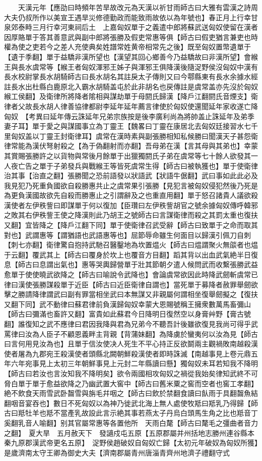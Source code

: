 　　天漢元年【應劭曰時頻年苦旱故改元為天漢以祈甘雨師古曰大雅有雲漢之詩周大夫仍叔所作以美宣王遇旱災修德勤政而能致雨故依以為年號也】春正月上行幸甘泉郊泰畤三月行幸河東祠后土　上嘉匈奴單于之義遣中郎將蘇武送匈奴使留在漢者因厚賂單于答其善意武與副中郎將張勝及假吏常惠等俱【師古曰假吏猶言兼吏也時權為使之吏若今之差人充使典矣姓譜常姓黄帝相常先之後】既至匈奴置幣遺單于【遺于季翻】單于益驕非漢所望也【漢望其回心鄉善今乃益驕故曰非漢所望】會緱王與長水虞常等【緱王者匈奴渾邪王姊子與渾邪王俱降漢後隨浞野侯沒匈奴中漢有長水校尉掌長水胡騎師古曰長水胡名其註戾太子傳則又曰今鄠縣東有長水余據水經註長水出杜縣白鹿原北入霸水胡騎盖屯於此非胡名也戻傳註是虞常盖亦先沒於匈奴緱工侯翻】及衛律所將降者隂相與謀劫單于母閼氏歸漢【降戶江翻閼氏音煙支】衛律者父故長水胡人律善協律都尉李延年延年薦言律使於匈奴使還聞延年家收遂亡降匈奴　【考異曰延年傳云誅延年兄弟宗族按是後李廣利尚為將帥盖止誅延年及弟季妻子耳】單于愛之與謀國事立為丁靈王【魏畧曰丁靈在康居北去匈奴廷接習水七千里匈奴盖以丁靈王封衛律耳】虞常在漢時素與副張勝相知私候勝曰聞漢天子甚怨衛律常能為漢伏弩射殺之【為于偽翻射而亦翻】吾母弟在漢【言其母與其弟也】幸蒙其賞賜張勝許之以貨物與常後月餘單于出獵獨閼氏子弟在虞常等七十餘人欲發其一人夜亡告之單于子弟發兵與戰緱王等皆死虞常生得【師古曰被執獲也】單于使衛律治其事【治直之翻】張勝聞之恐前語發以狀語武【狀語牛倨翻】武曰事如此此必及我見犯乃死重負國欲自殺勝惠共止之虞常果引張勝【見犯言被匈奴侵犯然後乃死是為更負漢國故欲先自殺而勝惠止之引謂辭及之也重直用翻】單于怒召諸貴人議欲殺漢使者左伊秩訾曰即謀單于何以復加【臣瓚曰左伊秩訾胡官之號余據匈奴傳呼韓邪之敗其右伊秩訾王使之降漢則此乃胡王之號師古曰言謀衛律而殺之其罰太重也復扶又翻】宜皆降之【降戶江翻下同】單于使衛律召武受辭【師古曰致單于之命而取其對也】武謂惠等【謂猶語也武語惠等也】屈節辱命雖生何面目以歸漢引佩刀自刺【刺七亦翻】衛律驚自抱持武馳召醫鑿地為坎置煴火【師古曰煴謂聚火無燄者也煴于云翻】覆武其上【師古曰覆身於坎上也覆音方目翻】蹈其背以出血武氣絶半日復息【師古曰息謂出氣也】惠等哭輿歸營單于壯其節朝夕遣人候問武而收繫張勝武益愈單于使使曉武欲降之【師古曰喻說令武降也】會論虞常欲因此時降武劒斬虞常已律曰漢使張勝謀殺單于近臣【師古曰近臣衛律自謂也】當死單于募降者赦罪舉劒欲擊之勝請降律謂武曰副有罪當相坐武曰本無謀又非親屬何謂相坐復舉劒擬之【復扶又翻下同】武不動律曰蘇君律前負漢歸匈奴幸蒙大恩賜號稱王擁衆數萬馬畜彌山【師古曰彌滿也畜許又翻】富貴如此蘇君今日降明日復然空以身膏艸野【膏古號翻】誰復知之武不應律曰君因我降與君為兄弟今不聽吾計後雖欲復見我尚可得乎武罵律曰汝為人臣子不顧恩義畔主背親【背蒲妹翻】為降虜於蠻夷何以汝為見【師古曰言何用見汝為也】且單于信汝使决人死生不平心持正反欲鬬兩主觀禍敗南越殺漢使者屠為九郡宛王殺漢使者頭縣北闕朝鮮殺漢使者即時誅滅【南越事見上卷元鼎五年六年宛事見上太初三年朝鮮事見上元封二年縣讀曰懸】獨匈奴未耳若知我不降明【師古曰若汝也言汝知我不降明矣】欲令兩國相攻匈奴之禍從我始矣律知武終不可脅白單于單于愈益欲降之乃幽武置大窖中【師古曰舊米粟之窖而空者也窖工孝翻】絶不飲食天雨雪武卧齧雪與旃毛幷咽之【師古曰飲於禁翻食讀曰飤雨于具翻齧魚結翻咽音宴吞也】數日不死匈奴以為神乃徙武北海上無人處使牧羝曰羝乳乃得歸【師古曰羝牡羊也羝不當產乳故設此言示絶其事若燕太子丹烏白頭馬生角之比也羝音丁奚翻乳音人喻翻】别其官屬常惠等各置他所　天雨白氂【師古曰氂毛之彊曲者音力之翻】　夏大旱　五月赦天下　發讁戍屯五原【五原郡屬并州括地志勝州連谷縣本秦九原郡漢武帝更名五原】　浞野侯趙破奴自匈奴亡歸【太初元年破奴為匈奴所獲】是歲濟南太守王卿為御史大夫【濟南郡屬青州唐淄青齊州地濟子禮翻守式